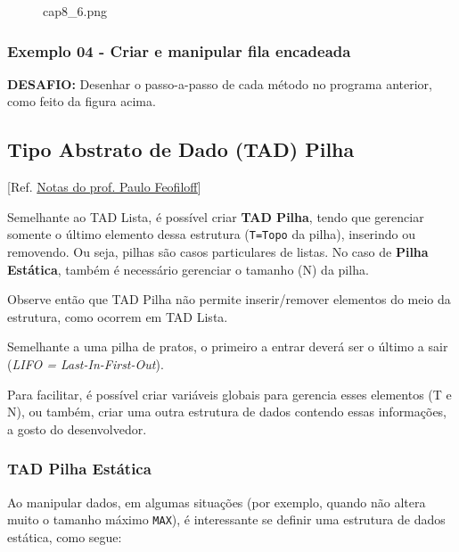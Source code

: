 \documentclass[12pt,a4paper]{article}
\begin{document}
    \begin{figure}
\centering
\caption{cap8\_6.png}
\end{figure}

    \hypertarget{exemplo-04---criar-e-manipular-fila-encadeada}{%
\subsubsection{Exemplo 04 - Criar e manipular fila
encadeada}\label{exemplo-04---criar-e-manipular-fila-encadeada}}

    \textbf{DESAFIO:} Desenhar o passo-a-passo de cada método no programa
anterior, como feito da figura acima.

    \hypertarget{tipo-abstrato-de-dado-tad-pilha}{%
\subsection{Tipo Abstrato de Dado (TAD)
Pilha}\label{tipo-abstrato-de-dado-tad-pilha}}

    {[}Ref.
\href{https://www.ime.usp.br/~pf/algoritmos/aulas/pilha.html}{Notas do
prof. Paulo Feofiloff}{]}

Semelhante ao TAD Lista, é possível criar \textbf{TAD Pilha}, tendo que
gerenciar somente o último elemento dessa estrutura (\texttt{T=Topo} da
pilha), inserindo ou removendo. Ou seja, pilhas são casos particulares
de listas. No caso de \textbf{Pilha Estática}, também é necessário
gerenciar o tamanho (N) da pilha.

Observe então que TAD Pilha não permite inserir/remover elementos do
meio da estrutura, como ocorrem em TAD Lista.

Semelhante a uma pilha de pratos, o primeiro a entrar deverá ser o
último a sair (\emph{LIFO = Last-In-First-Out}).

Para facilitar, é possível criar variáveis globais para gerencia esses
elementos (T e N), ou também, criar uma outra estrutura de dados
contendo essas informações, a gosto do desenvolvedor.

    \hypertarget{tad-pilha-estuxe1tica}{%
\subsubsection{TAD Pilha Estática}\label{tad-pilha-estuxe1tica}}

    Ao manipular dados, em algumas situações (por exemplo, quando não altera
muito o tamanho máximo \texttt{MAX}), é interessante se definir uma
estrutura de dados estática, como segue:
\end{document}
